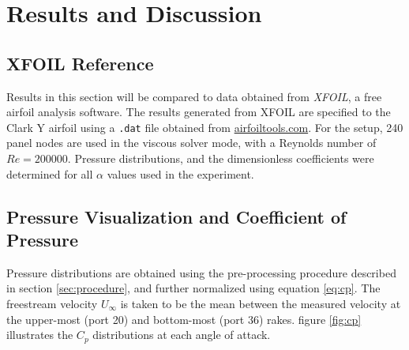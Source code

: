 \documentclass[runningheads]{llncs}
\begin{document}
\section{Results and Discussion}

\subsection{XFOIL Reference}

\noindent
Results in this section will be compared to data obtained from \textit{XFOIL}, a free airfoil analysis software. The results generated from XFOIL are specified to the Clark Y airfoil using a \verb|.dat| file obtained from \href{http://airfoiltools.com/airfoil/details?airfoil=clarky-il}{airfoiltools.com}. For the setup, 240 panel nodes are used in the viscous solver mode, with a Reynolds number of $Re = 200000$. Pressure distributions, and the dimensionless coefficients were determined for all $\alpha$ values used in the experiment.\newline

\subsection{Pressure Visualization and Coefficient of Pressure}

\noindent
Pressure distributions are obtained using the pre-processing procedure described in section \ref{sec:procedure}, and further normalized using equation \ref{eq:cp}. The freestream velocity $U_\infty$ is taken to be the mean between the measured velocity at the upper-most (port 20) and bottom-most (port 36) rakes. figure \ref{fig:cp} illustrates the $C_p$ distributions at each angle of attack. \newline
\end{document}

